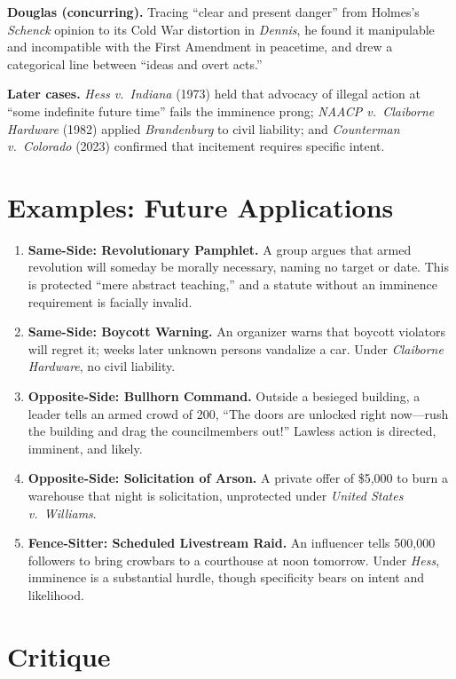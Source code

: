 \documentclass[12pt]{article}
\begin{document}
\textbf{Douglas (concurring).} Tracing ``clear and present danger'' from Holmes's \textit{Schenck} opinion to its Cold War distortion in \textit{Dennis}, he found it manipulable and incompatible with the First Amendment in peacetime, and drew a categorical line between ``ideas and overt acts.''

\textbf{Later cases.} \textit{Hess v.\ Indiana} (1973) held that advocacy of illegal action at ``some indefinite future time'' fails the imminence prong; \textit{NAACP v.\ Claiborne Hardware} (1982) applied \textit{Brandenburg} to civil liability; and \textit{Counterman v.\ Colorado} (2023) confirmed that incitement requires specific intent.

\section{Examples: Future Applications}

\begin{enumerate}
\item \textbf{Same-Side: Revolutionary Pamphlet.} A group argues that armed revolution will someday be morally necessary, naming no target or date. This is protected ``mere abstract teaching,'' and a statute without an imminence requirement is facially invalid.
\item \textbf{Same-Side: Boycott Warning.} An organizer warns that boycott violators will regret it; weeks later unknown persons vandalize a car. Under \textit{Claiborne Hardware}, no civil liability.
\item \textbf{Opposite-Side: Bullhorn Command.} Outside a besieged building, a leader tells an armed crowd of 200, ``The doors are unlocked right now---rush the building and drag the councilmembers out!'' Lawless action is directed, imminent, and likely.
\item \textbf{Opposite-Side: Solicitation of Arson.} A private offer of \$5,000 to burn a warehouse that night is solicitation, unprotected under \textit{United States v.\ Williams}.
\item \textbf{Fence-Sitter: Scheduled Livestream Raid.} An influencer tells 500,000 followers to bring crowbars to a courthouse at noon tomorrow. Under \textit{Hess}, imminence is a substantial hurdle, though specificity bears on intent and likelihood.
\end{enumerate}

\section{Critique}
\end{document}
